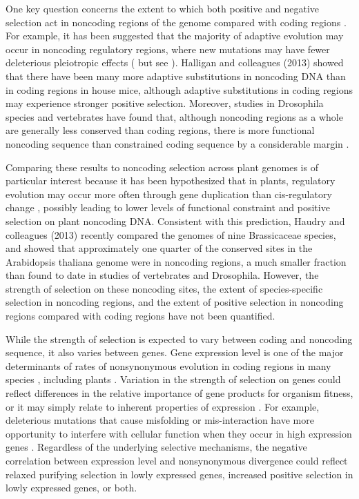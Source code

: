 One key question concerns the extent to which both positive and negative selection act in noncoding regions of the genome compared with coding regions \citep{andolfatto2005, hough2013, zhen2012, Halligan2013}. For example, it has been suggested that the majority of adaptive evolution may occur in noncoding regulatory regions, where new mutations may have fewer deleterious pleiotropic effects (\citet{wray2007, carroll2005} but see \citet{hoekstra2007}). Halligan and colleagues (2013) showed that there have been many more adaptive substitutions in noncoding DNA than in coding regions in house mice, although adaptive substitutions in coding regions may experience stronger positive selection. Moreover, studies in Drosophila species and vertebrates have found that, although noncoding regions as a whole are generally less conserved than coding regions, there is more functional noncoding sequence than constrained coding sequence by a considerable margin \citep{andolfatto2005,keightley2003}. 

Comparing these results to noncoding selection across plant genomes is of particular interest because it has been hypothesized that in plants, regulatory evolution may occur more often through gene duplication than cis-regulatory change \citep{lockton2005}, possibly leading to lower levels of functional constraint and positive selection on plant noncoding DNA. Consistent with this prediction, Haudry and colleagues (2013) recently compared the genomes of nine Brassicaceae species, and showed that approximately one quarter of the conserved sites in the Arabidopsis thaliana genome were in noncoding regions, a much smaller fraction than found to date in studies of vertebrates and Drosophila. However, the strength of selection on these noncoding sites, the extent of species-specific selection in noncoding regions, and the extent of positive selection in noncoding regions compared with coding regions have not been quantified. 

While the strength of selection is expected to vary between coding and noncoding sequence, it also varies between genes. Gene expression level is one of the major determinants of rates of nonsynonymous evolution in coding regions in many species \citep{pal2001,subramanian2004,drummond2006}, including plants \citep{yang2011, slotte2011genomic, paape2013, renaut2012}. Variation in the strength of selection on genes could reflect differences in the relative importance of gene products for organism fitness, or it may simply relate to inherent properties of expression \citep{gaut2011}. For example, deleterious mutations that cause misfolding or mis-interaction have more opportunity to interfere with cellular function when they occur in high expression genes \citep{park2013,yang2012,drummond2008}. Regardless of the underlying selective mechanisms, the negative correlation between expression level and nonsynonymous divergence could reflect relaxed purifying selection in lowly expressed genes, increased positive selection in lowly expressed genes, or both.


